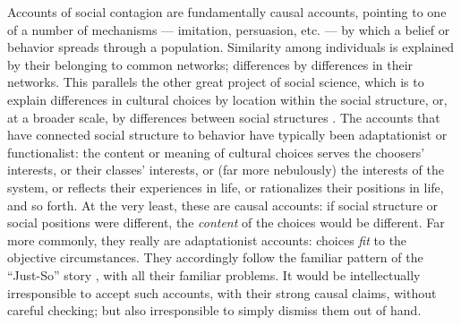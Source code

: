 \documentclass{article}
\begin{document}
\begin{multicols}{2}
Accounts of social contagion are fundamentally causal accounts, pointing to one
of a number of mechanisms --- imitation, persuasion, etc. --- by which a belief
or behavior spreads through a population.  Similarity among individuals is
explained by their belonging to common networks; differences by differences in
their networks.  This parallels the other great project of social science,
which is to explain differences in cultural choices by location within the
social structure, or, at a broader scale, by differences between social
structures \citep{Boudon-ideology, Berger-culture, Lieberson-matter-of-taste}.
The accounts that have connected social structure to behavior have typically
been adaptationist or functionalist: the content or meaning of cultural choices
serves the choosers' interests, or their classes' interests, or (far more
nebulously) the interests of the system, or reflects their experiences in life,
or rationalizes their positions in life, and so forth.  At the very least,
these are causal accounts: if social structure or social positions were
different, the {\em content} of the choices would be different.  Far more
commonly, they really are adaptationist accounts: choices {\em fit} to the
objective circumstances.  They accordingly follow the familiar pattern of the
``Just-So'' story \citep{Kipling-just-so}, with all their familiar problems.
It would be intellectually irresponsible to accept such accounts, with their
strong causal claims, without careful checking; but also irresponsible to
simply dismiss them out of hand.


\end{multicols}
\end{document}
